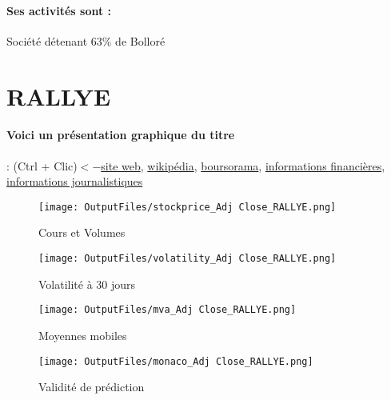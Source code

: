 \documentclass[11pt,a4paper]{report}%
\begin{document}
\paragraph{Ses activités sont : } Société détenant 63\% de Bolloré 
    
    \newpage

\section{RALLYE}

\paragraph{Voici un présentation graphique du titre} : (Ctrl + Clic)$<-$\href{http://www.rallye.fr/fr/investisseurs/resultats-financiers}{site web}, \href{https://fr.wikipedia.org/wiki/Rallye_(entreprise)}{wikipédia}, \href{https://www.boursorama.com/cours/1rPRAL}{boursorama}, \href{https://www.qwant.com/?q=site:https:%2f%2fwww.easybourse.com%2faction-societe%2fRALLYE&t=web&client=ext-firefox-hp}{informations financières}, \href{https://bourse.lerevenu.com/cours-de-bourse/fiche-valeur-synthese/RALLYE/RAL-FR}{informations journalistiques}
\begin{figure}[!htb]
   \begin{minipage}{0.5\textwidth}
     \centering
     \texttt{[image: OutputFiles/stockprice\_Adj Close\_RALLYE.png]}
     \caption{Cours et Volumes}\label{Fig:price_RALLYE}
   \end{minipage}\hfill
   \begin{minipage}{0.5\textwidth}
     \centering
     \texttt{[image: OutputFiles/volatility\_Adj Close\_RALLYE.png]}
     \caption{Volatilité à 30 jours}\label{Fig:volat_RALLYE}
   \end{minipage}
\end{figure}
\begin{figure}[!htb]
   \begin{minipage}{0.5\textwidth}
     \centering
     \texttt{[image: OutputFiles/mva\_Adj Close\_RALLYE.png]}
     \caption{Moyennes mobiles}\label{Fig:mva_RALLYE}
   \end{minipage}\hfill
   \begin{minipage}{0.5\textwidth}
     \centering
     \texttt{[image: OutputFiles/monaco\_Adj Close\_RALLYE.png]}
     \caption{Validité de prédiction}\label{Fig:prediction_RALLYE}
   \end{minipage}
\end{figure}
\end{document}
